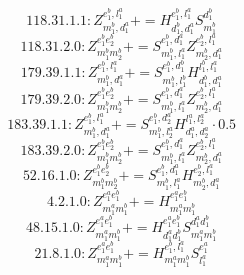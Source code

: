 \documentclass[letterpaper,10pt,fleqn,leqno,onecolumn]{article}
\begin{document}
\begin{equation} \;\;\;\;\;\;  118.31.1.1: Z^{e_{1}^{b},l_{1}^{a}}_{m_{1}^{b},d_{1}^{a}}+=H^{e_{1}^{b},l_{1}^{a}}_{d_{1}^{b},d_{1}^{a}}S^{d_{1}^{b}}_{m_{1}^{b}} \end{equation}
\begin{equation} \;\;\;\;\;\;  118.31.2.0: Z^{e_{1}^{b}e_{2}^{b}}_{m_{1}^{b}m_{2}^{b}}+=S^{e_{1}^{b},d_{1}^{a}}_{m_{1}^{b},l_{1}^{a}}Z^{e_{2}^{b},l_{1}^{a}}_{m_{2}^{b},d_{1}^{a}} \end{equation}
\begin{equation} \;\;\;\;\;\;  179.39.1.1: Z^{e_{1}^{b},l_{1}^{a}}_{m_{1}^{b},d_{1}^{a}}+=S^{e_{1}^{b},d_{1}^{b}}_{m_{1}^{b},l_{1}^{b}}H^{l_{1}^{b},l_{1}^{a}}_{d_{1}^{b},d_{1}^{a}} \end{equation}
\begin{equation} \;\;\;\;\;\;  179.39.2.0: Z^{e_{1}^{b}e_{2}^{b}}_{m_{1}^{b}m_{2}^{b}}+=S^{e_{1}^{b},d_{1}^{a}}_{m_{1}^{b},l_{1}^{a}}Z^{e_{2}^{b},l_{1}^{a}}_{m_{2}^{b},d_{1}^{a}} \end{equation}
\begin{equation} \;\;\;\;\;\;  183.39.1.1: Z^{e_{1}^{b},l_{1}^{a}}_{m_{1}^{b},d_{1}^{a}}+=S^{e_{1}^{b},d_{2}^{a}}_{m_{1}^{b},l_{2}^{a}}H^{l_{1}^{a},l_{2}^{a}}_{d_{1}^{a},d_{2}^{a}}\cdot 0.5 \end{equation}
\begin{equation} \;\;\;\;\;\;  183.39.2.0: Z^{e_{1}^{b}e_{2}^{b}}_{m_{1}^{b}m_{2}^{b}}+=S^{e_{1}^{b},d_{1}^{a}}_{m_{1}^{b},l_{1}^{a}}Z^{e_{2}^{b},l_{1}^{a}}_{m_{2}^{b},d_{1}^{a}} \end{equation}
\begin{equation} \;\;\;\;\;\;  52.16.1.0: Z^{e_{1}^{b}e_{2}^{b}}_{m_{1}^{b}m_{2}^{b}}+=S^{e_{1}^{b},d_{1}^{a}}_{m_{1}^{b},l_{1}^{a}}H^{e_{2}^{b},l_{1}^{a}}_{m_{2}^{b},d_{1}^{a}} \end{equation}
\begin{equation} \;\;\;\;\;\;  4.2.1.0: Z^{e_{1}^{a}e_{1}^{b}}_{m_{1}^{a}m_{1}^{b}}+=H^{e_{1}^{a}e_{1}^{b}}_{m_{1}^{a}m_{1}^{b}} \end{equation}
\begin{equation} \;\;\;\;\;\;  48.15.1.0: Z^{e_{1}^{a}e_{1}^{b}}_{m_{1}^{a}m_{1}^{b}}+=H^{e_{1}^{a}e_{1}^{b}}_{d_{1}^{a}d_{1}^{b}}S^{d_{1}^{a}d_{1}^{b}}_{m_{1}^{a}m_{1}^{b}} \end{equation}
\begin{equation} \;\;\;\;\;\;  21.8.1.0: Z^{e_{1}^{a}e_{1}^{b}}_{m_{1}^{a}m_{1}^{b}}+=H^{e_{1}^{b},l_{1}^{a}}_{m_{1}^{a}m_{1}^{b}}S^{e_{1}^{a}}_{l_{1}^{a}} \end{equation}
\end{document}
